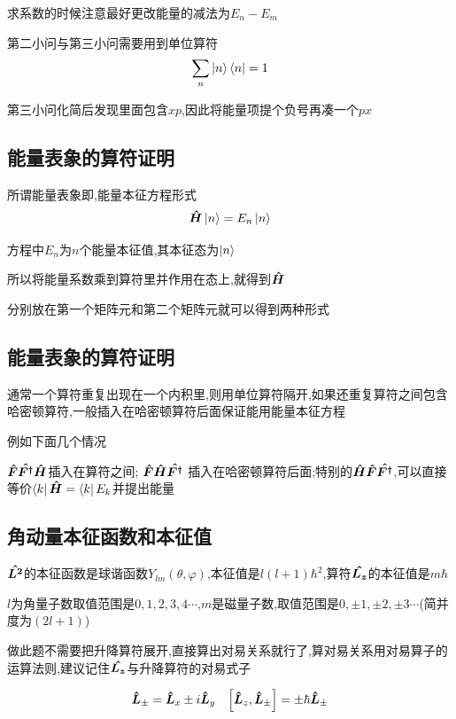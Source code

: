             求系数的时候注意最好更改能量的减法为$E_{n} - E_{m}$
            
            第二小问与第三小问需要用到单位算符
            $$ \sum_{n} \ket{n} \bra{n} = 1 $$

            第三小问化简后发现里面包含$xp$,因此将能量项提个负号再凑一个$px$

        \subsection{能量表象的算符证明}
            所谓能量表象即,能量本征方程形式
                $$ \vu*{H} \ket{n} = E_{n} \ket{n} $$

            方程中$E_{n}$为$n$个能量本征值,其本征态为$\ket{n}$

            所以将能量系数乘到算符里并作用在态上,就得到$\vu*{H}$

            分别放在第一个矩阵元和第二个矩阵元就可以得到两种形式
        \subsection{能量表象的算符证明}
            通常一个算符重复出现在一个内积里,则用单位算符隔开,如果还重复算符之间包含哈密顿算符,一般插入在哈密顿算符后面保证能用能量本征方程
            
            例如下面几个情况
            

            $\vu*{F}\vu*{{F^{\dagger}}}\vu*{H}$插入在算符之间; $\vu*{F}\vu*{H} \vu*{F^{\dagger}}$ 插入在哈密顿算符后面;特别的$\vu*{H} \vu*{F} \vu*{F^{\dagger}}$,可以直接等价$ \bra{k} \vu*{H} = \bra{k} E_{k}$并提出能量
        
        \subsection{角动量本征函数和本征值}
            $\vu*{L^{2}}$的本征函数是球谐函数$Y_{lm}(\theta,\varphi)$,本征值是$l(l+1)\hbar^{2}$,算符$\vu*{L_{z}}$的本征值是$m\hbar$
            
            $l$为角量子数取值范围是$0,1,2,3,4\cdots$,$m$是磁量子数,取值范围是$0,\pm1,\pm2,\pm3\cdots$(简并度为$(2l+1)$)

            做此题不需要把升降算符展开,直接算出对易关系就行了,算对易关系用对易算子的运算法则,建议记住$\vu*{L_{z}}$与升降算符的对易式子

            $$\vu*{L}_{\pm} = \vu*{L}_{x} \pm  i \vu*{L}_{y} \quad \comm{\vu*{L}_{z}}{\vu*{{L}}_{\pm}} = \pm \hbar \vu*{L}_{\pm} $$

